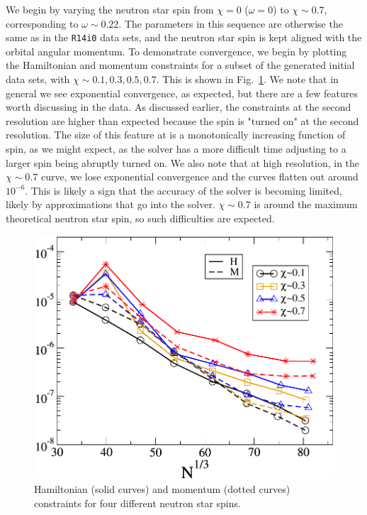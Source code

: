 We begin by
varying the neutron star spin from $\chi=0$ ($\omega=0$) to $\chi\sim0.7$,
corresponding to $\omega\sim0.22$. The parameters in this
sequence are otherwise the same as in the {\tt R14i0} data sets, and the neutron star spin is kept aligned with the orbital
angular momentum. To demonstrate convergence, we begin by plotting the
Hamiltonian and momentum constraints for a subset of the generated
initial data sets, with $\chi\sim{0.1,0.3,0.5,0.7}$. This is shown in
Fig.~\ref{fig:OmegaSeqHamMom}. We note that in general we see
exponential convergence, as expected, but there are a few features
worth discussing in the data.
As discussed earlier, the constraints at the second resolution are higher than expected because the spin is "turned on" at the second resolution.
The size of this feature at is a monotonically increasing function of spin, as we might
expect, as the solver has a more difficult time adjusting to a larger spin being abruptly turned on. We also note that at high resolution, in
the $\chi\sim 0.7$ curve, we lose exponential convergence and the
curves flatten out around $10^{-6}$.  This is likely a sign that the accuracy of the
solver is becoming limited, likely by approximations that go into the
solver. $\chi\sim 0.7$ is around the maximum theoretical neutron star
spin, so such difficulties are expected.

\begin{figure}
\includegraphics[width=0.95\columnwidth]{chap4/OmegaSeqHamMom}
\caption[Constraints for the $\chi_{\rm NS}$ sequence.]{\label{fig:OmegaSeqHamMom} Hamiltonian (solid curves) and
momentum (dotted curves) constraints for four different neutron star spins.}
\end{figure}

